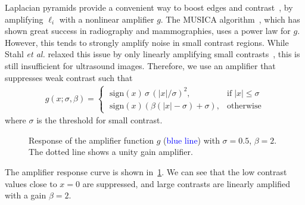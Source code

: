 Laplacian pyramids provide a convenient way to boost edges and contrast~\cite{vuylsteke_multiscale_1994, stahl_noiseresistant_1999, dippel_multiscale_2002}, by amplifying \({\boldsymbol\ell}_{i}\) with a nonlinear amplifier \(g\).
The MUSICA algorithm~\cite{vuylsteke_multiscale_1994}, which has shown great success in radiography and mammographies, uses a power law for \(g\).
However, this tends to strongly amplify noise in small contrast regions.
While Stahl \textit{et al.} relaxed this issue by only linearly amplifying small contrasts~\cite{stahl_noiseresistant_1999}, this is still insufficient for ultrasound images.
Therefore, we use an amplifier that suppresses weak contrast such that
\begin{align}
  g\left(x; \sigma, \beta \right) =
  \begin{cases}
    \;\mathrm{sign}\left( x \right) \, \sigma \, {\left( |x|/\sigma \right)}^2, & \text{if}\; |x| \leq \sigma \\
    \;\mathrm{sign}\left( x \right) \left( \beta \left(|x| - \sigma \right) + \sigma \right), & \text{otherwise}
  \end{cases}
\end{align}
where \(\sigma\) is the threshold for small contrast.
%
\begin{figure}[t]
  \vspace{-0.1in}
  \centering
  \caption{Response of the amplifier function \(g\) (\textcolor{blue}{blue line}) with \(\sigma=0.5\), \(\beta=2\).
  The dotted line shows a unity gain amplifier.}\label{fig:amp}
\end{figure}
%
The amplifier response curve is shown in~\cref{fig:amp}.
We can see that the low contrast values close to \(x=0\) are suppressed, and large contrasts are linearly amplified with a gain \(\beta=2\).

